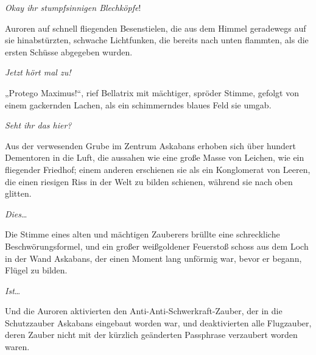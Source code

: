 \emph{Okay ihr stumpfsinnigen Blechköpfe}!

Auroren auf schnell fliegenden Besenstielen, die aus dem Himmel geradewegs auf sie hinabstürzten, schwache Lichtfunken, die bereits nach unten flammten, als die ersten Schüsse abgegeben wurden.

\emph{Jetzt hört mal zu!}

„Protego Maximus!“, rief Bellatrix mit mächtiger, spröder Stimme, gefolgt von einem gackernden Lachen, als ein schimmerndes blaues Feld sie umgab.

\emph{Seht ihr das hier?}

Aus der verwesenden Grube im Zentrum Askabans erhoben sich über hundert Dementoren in die Luft, die aussahen wie eine große Masse von Leichen, wie ein fliegender Friedhof; einem anderen erschienen sie als ein Konglomerat von Leeren, die einen riesigen Riss in der Welt zu bilden schienen, während sie nach oben glitten.

\emph{Dies}…

Die Stimme eines alten und mächtigen Zauberers brüllte eine schreckliche Beschwörungsformel, und ein großer weißgoldener Feuerstoß schoss aus dem Loch in der Wand Askabans, der einen Moment lang unförmig war, bevor er begann, Flügel zu bilden.

\emph{Ist}…

Und die Auroren aktivierten den Anti-Anti-Schwerkraft-Zauber, der in die Schutzzauber Askabans eingebaut worden war, und deaktivierten alle Flugzauber, deren Zauber nicht mit der kürzlich geänderten Passphrase verzaubert worden waren.

